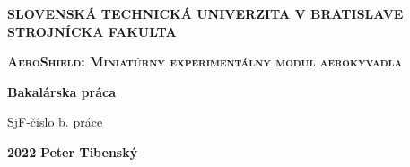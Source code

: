 \renewcommand\thepage{\roman{page}}
\thispagestyle{empty}

\noindent \begin{center}
\textbf{{\large{}SLOVENSKÁ TECHNICKÁ UNIVERZITA V BRATISLAVE}}\\
\textbf{{\large{}STROJNÍCKA FAKULTA}}\textbf{\large{} }\\
\vspace{3cm}
\par\end{center}

\noindent \begin{center}
\vspace{3cm}
\par\end{center}



\begin{center}
\textbf{\textsc{\Large{}AeroShield: Miniatúrny experimentálny modul aerokyvadla}}\\
\par\end{center}{\Large \par}

\begin{center}
\textbf{\large{}Bakalárska práca}\\
\par\end{center}{\large \par}

\begin{center}
{\large{}SjF-číslo b. práce}\\
\par\end{center}{\large \par}



\vfill
\noindent \textbf{\large{}2022} \hfill \textbf{\large{} Peter Tibenský}
\cleardoublepage
